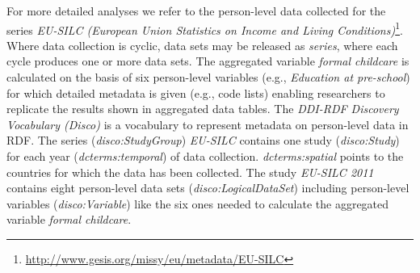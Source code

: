 \documentclass{llncs}
\newcommand{\ke}[1]{\todo[size=\small, color=red!40]{\textbf{Kai:} #1}}
\newcommand{\tb}[1]{\todo[size=\small, color=green!40]{\textbf{Thomas:} #1}}
\begin{document}
For more detailed analyses we refer to the person-level data collected for the series \emph{EU-SILC (European Union Statistics on Income and Living Conditions)}\footnote{\url{http://www.gesis.org/missy/eu/metadata/EU-SILC}}. 
Where data collection is cyclic, data sets may be released as \emph{series}, 
where each cycle produces one or more data sets. 
The aggregated variable \emph{formal childcare} is calculated on the basis of six person-level variables 
(e.g., \emph{Education at pre-school})
for which detailed metadata is given 
(e.g., code lists)
enabling researchers to replicate the results shown in aggregated data tables.
The \emph{DDI-RDF Discovery Vocabulary (Disco)} is a vocabulary to represent metadata on person-level data in RDF.
The series (\emph{disco:StudyGroup}) \emph{EU-SILC} contains one study (\emph{disco:Study}) for each year (\emph{dcterms:temporal}) of data collection.   
\emph{dcterms:spatial} points to the countries for which the data has been collected.
The study \emph{EU-SILC 2011} contains eight person-level data sets (\emph{disco:LogicalDataSet})
including person-level variables (\emph{disco:Variable}) like the six ones needed to calculate the aggregated variable \emph{formal childcare}.
\end{document}
